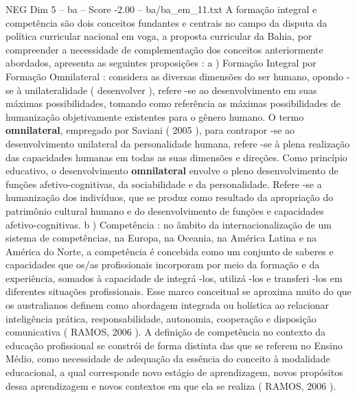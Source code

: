 \begin{textsample}{NEG Dim 5 – ba – Score -2.00 – ba/ba\_em\_11.txt}
A formação integral e competência são dois conceitos fundantes e centrais no campo da disputa da política curricular nacional em voga, a proposta curricular da Bahia, por compreender a necessidade de complementação dos conceitos anteriormente abordados, apresenta as seguintes proposições : a ) Formação Integral por Formação Omnilateral : considera as diversas dimensões do ser humano, opondo -se à unilateralidade ( desenvolver ), refere -se ao desenvolvimento em suas máximas possibilidades, tomando como referência as máximas possibilidades de humanização objetivamente existentes para o gênero humano.
O termo \textbf{omnilateral}, empregado por Saviani ( 2005 ), para contrapor -se ao desenvolvimento unilateral da personalidade humana, refere -se à plena realização das capacidades humanas em todas as suas dimensões e direções.
Como princípio educativo, o desenvolvimento \textbf{omnilateral} envolve o pleno desenvolvimento de funções afetivo-cognitivas, da sociabilidade e da personalidade.
Refere -se a humanização dos indivíduos, que se produz como resultado da apropriação do patrimônio cultural humano e do desenvolvimento de funções e capacidades afetivo-cognitivas. b ) Competência : no âmbito da internacionalização de um sistema de competências, na Europa, na Oceania, na América Latina e na América do Norte, a competência é concebida como um conjunto de saberes e capacidades que os/as profissionais incorporam por meio da formação e da experiência, somados à capacidade de integrá -los, utilizá -los e transferi -los em diferentes situações profissionais.
Esse marco conceitual se aproxima muito do que os australianos definem como abordagem integrada ou holística ao relacionar inteligência prática, responsabilidade, autonomia, cooperação e disposição comunicativa ( RAMOS, 2006 ).
A definição de competência no contexto da educação profissional se constrói de forma distinta das que se referem no Ensino Médio, como necessidade de adequação da essência do conceito à modalidade educacional, a qual corresponde novo estágio de aprendizagem, novos propósitos dessa aprendizagem e novos contextos em que ela se realiza ( RAMOS, 2006 ).

\end{textsample}
